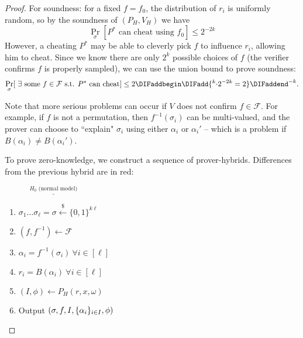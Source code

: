 \begin{proof}
For soundness: for a fixed $f = f_0$, the distribution of $r_i$ is
uniformly random, so by the soundness of $(P_H, V_H)$ we have
$$\Pr_\sigma[\text{$P^*$ can cheat using $f_0$}] \leq 2^{-2k}$$
However, a cheating $P^*$ may be able to cleverly pick $f$ to influence $r_i$,
allowing him to cheat. Since we know there are only $2^k$ possible choices of
$f$ (the verifier confirms $f$ is properly sampled), we can use the union bound
to prove soundness:
$$\Pr_\sigma[~\exists \text{ some $f \in \mathcal{F}$ s.t. $P^*$ can cheat}] \leq 2\DIFaddbegin \DIFadd{^{k} \cdot 2^{-2k} = 2}\DIFaddend ^{-k}.$$

Note that more serious problems can occur if $V$ does not confirm $f\in \mathcal{F}$. For example, if $f$ is not a permutation, then
$f^{-1}(\sigma_i)$ can be multi-valued, and the prover can choose to ``explain"
$\sigma_i$ using either $\alpha_i$ or $\alpha_i'$ -- which is a problem if
$B(\alpha_i) \neq B(\alpha_i')$.

To prove zero-knowledge, we construct a sequence of prover-hybrids. \DIFaddbegin {}\DIFaddend Differences from the previous hybrid are in red:


\newcommand{\htitle}[1]{\vspace{0.3cm}$\overset{#1}{\underline{\hspace{5cm}}}$}
\newcommand{\diff}[1]{{\color{red} #1}}

\htitle{H_0 \text{ (normal model)}}
\begin{enumerate}
    \item $\sigma_1\hdots\sigma_\ell = \sigma \xleftarrow{\$} \{0,1\}^{k\ell}$
    \item $(f, f^{-1}) \gets \mathcal{F}$
    \item $\alpha_i = f^{-1}(\sigma_i) ~\forall i \in [\ell]$
    \item $r_i = B(\alpha_i) ~\forall i \in [\ell]$
    \item $(I, \phi) \gets P_H(r, x, \omega)$
    \item Output $(\sigma, f, I, \{\alpha_i\}_{i \in I}, \phi)$
\end{enumerate}


\end{proof}
